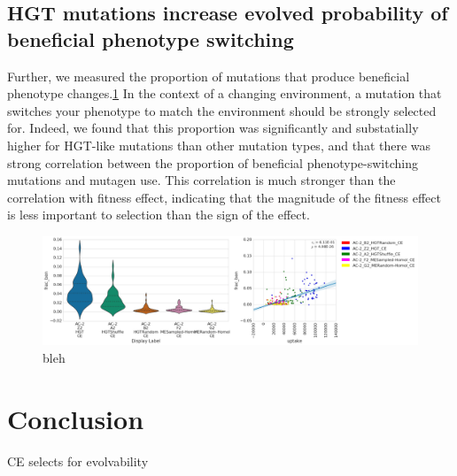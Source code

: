 \documentclass[PhD]{msu-thesis}
\begin{document}

\subsection{HGT mutations increase evolved probability of beneficial phenotype switching}

Further, we measured the proportion of mutations that produce beneficial phenotype changes.\ref{fig:mutagen_use_vs_fraction_beneficial} In the context of a changing environment, a mutation that switches your phenotype to match the environment should be strongly selected for. Indeed, we found that this proportion was significantly and substatially higher for HGT-like mutations than other mutation types, and that there was strong correlation between the proportion of beneficial phenotype-switching mutations and mutagen use. This correlation is much stronger than the correlation with fitness effect, indicating that the magnitude of the fitness effect is less important to selection than the sign of the effect.

\begin{figure}[h!]
\begin{center}
\includegraphics[width=0.7\columnwidth]{figures/HGT/mutagen_use_vs_fraction_beneficial.png}
\caption{bleh
}\label{fig:mutagen_use_vs_fraction_beneficial}
\end{center}
\end{figure}



\section{Conclusion}


CE selects for evolvability 
\end{document}
